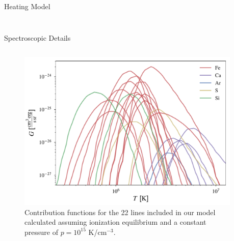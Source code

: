 \documentclass[final]{beamer}
\begin{document}
\begin{frame}
\begin{columns}[T]
\begin{column}{0.49\linewidth}
\begin{block}{Heating Model}
\begin{columns}[T]
\begin{column}{0.49\columnwidth}
\begin{figure}
        \label{fig:wait_times}
        \end{figure}
      \end{column}
      \end{columns}
    \end{block}
    \begin{block}{Spectroscopic Details}
      \begin{columns}[T]
        \begin{column}{0.49\columnwidth}
          \begin{figure}
            \includegraphics[width=\columnwidth]{figures/contribution_functions.pdf}
            \caption{Contribution functions for the 22 lines included in our model calculated assuming ionization equilibrium and a constant pressure of $p=10^{15}$ K/$\mathrm{cm}^{-3}$.}    
          \end{figure}
        \end{column}
        \begin{column}{0.49\columnwidth}
          \begin{table}
            \centering
            \begin{minipage}{0.49\columnwidth}
              
            \end{minipage}
            \begin{minipage}{0.49\columnwidth}
              
            \end{minipage}
            \caption{Ion names and wavelengths for all 22 lines included in our model \label{tab:line_table}}

\end{table}
\end{column}
\end{columns}
\end{block}
\end{column}
\end{columns}
\end{frame}
\end{document}
